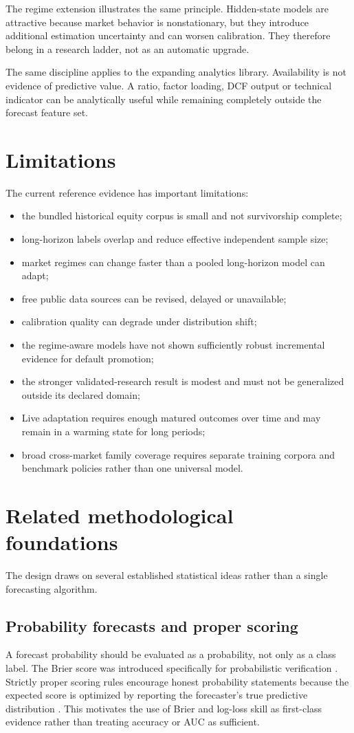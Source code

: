 \documentclass[11pt]{article}
\begin{document}
The regime extension illustrates the same principle. Hidden-state models are attractive because market behavior is nonstationary, but they introduce additional estimation uncertainty and can worsen calibration. They therefore belong in a research ladder, not as an automatic upgrade.

The same discipline applies to the expanding analytics library. Availability is not evidence of predictive value. A ratio, factor loading, DCF output or technical indicator can be analytically useful while remaining completely outside the forecast feature set.

\section{Limitations}
The current reference evidence has important limitations:
\begin{itemize}[itemsep=0.2em]
\item the bundled historical equity corpus is small and not survivorship complete;
\item long-horizon labels overlap and reduce effective independent sample size;
\item market regimes can change faster than a pooled long-horizon model can adapt;
\item free public data sources can be revised, delayed or unavailable;
\item calibration quality can degrade under distribution shift;
\item the regime-aware models have not shown sufficiently robust incremental evidence for default promotion;
\item the stronger validated-research result is modest and must not be generalized outside its declared domain;
\item Live adaptation requires enough matured outcomes over time and may remain in a warming state for long periods;
\item broad cross-market family coverage requires separate training corpora and benchmark policies rather than one universal model.
\end{itemize}


\section{Related methodological foundations}
The design draws on several established statistical ideas rather than a single forecasting algorithm.

\subsection{Probability forecasts and proper scoring}
A forecast probability should be evaluated as a probability, not only as a class label. The Brier score was introduced specifically for probabilistic verification \citep{brier1950verification}. Strictly proper scoring rules encourage honest probability statements because the expected score is optimized by reporting the forecaster's true predictive distribution \citep{gneiting2007proper}. This motivates the use of Brier and log-loss skill as first-class evidence rather than treating accuracy or AUC as sufficient.
\end{document}
